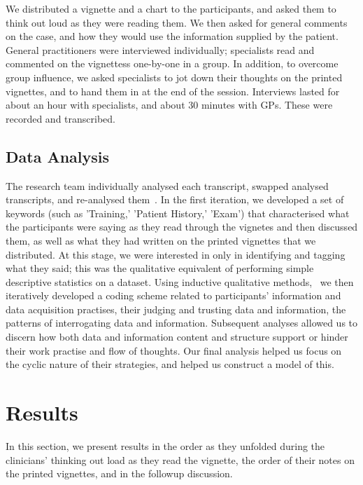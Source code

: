 \documentclass{sigchi}
\begin{document}
We distributed a vignette and a chart to the participants, and asked them to think out loud as they were reading them.  We then asked for general comments on the case, and how they would use the information supplied by the patient.  General practitioners were interviewed individually; specialists read and commented on the vignettess one-by-one in a group.  In addition, to overcome group influence, we asked specialists to jot down their thoughts on the printed vignettes, and to hand them in at the end of the session.  Interviews lasted for about an hour with specialists, and about 30 minutes with GPs.  These were recorded and transcribed.

\subsection{Data Analysis}
The research team individually analysed each transcript, swapped analysed transcripts, and re-analysed them~\cite{pope2000qualitative}.  In the first iteration, we developed a set of keywords (such as 'Training,' 'Patient History,' 'Exam') that characterised what the participants were saying as they read through the vignetes and then discussed them, as well as what they had written on the printed vignettes that we distributed. At this stage, we were interested in only in identifying and tagging what they said; this was the qualitative equivalent of performing simple descriptive statistics on a dataset.  Using inductive qualitative methods,~\cite{corbin2014basics} we then iteratively developed a coding scheme related to participants' information and data acquisition practises, their judging and trusting data and information, the patterns of interrogating data and information. Subsequent analyses allowed us to discern how both data and information content and structure support or hinder their work practise and flow of thoughts.  Our final analysis helped us focus on the cyclic nature of their strategies, and helped us construct a model of this.


\section{Results}

\newcommand{\bigquote}[2]{
    \begin{quote}
        #1~--~\textit{#2}
    \end{quote}
}

In this section, we present results in the order as they unfolded during the clinicians' thinking out load as they read the vignette, the order of their notes on the printed vignettes, and in the followup discussion.
    
\end{document}
